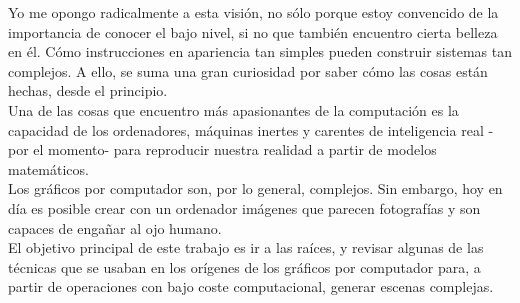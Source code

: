 Yo me opongo radicalmente a esta visión, no sólo porque estoy convencido de la importancia de conocer el bajo nivel, si no que también encuentro cierta belleza en él. Cómo instrucciones en apariencia tan simples pueden construir sistemas tan complejos. A ello, se suma una gran curiosidad por saber cómo las cosas están hechas, desde el principio.\\

Una de las cosas que encuentro más apasionantes de la computación es la capacidad de los ordenadores, máquinas inertes y carentes de inteligencia real -por el momento- para reproducir nuestra realidad a partir de modelos matemáticos.\\

Los gráficos por computador son, por lo general, complejos. Sin embargo, hoy en día es posible crear con un ordenador imágenes que parecen fotografías y son capaces de engañar al ojo humano.\\

El objetivo principal de este trabajo es ir a las raíces, y revisar algunas de las técnicas que se usaban en los orígenes de los gráficos por computador para, a partir de operaciones con bajo coste computacional, generar escenas complejas.

